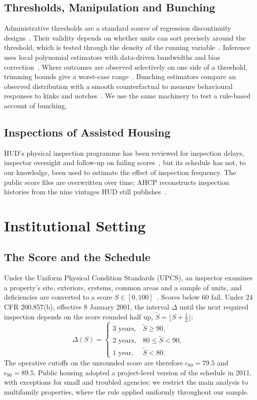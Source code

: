 \documentclass[10pt,twocolumn,letterpaper]{article}
\begin{document}
\subsection{Thresholds, Manipulation and Bunching}
Administrative thresholds are a standard source of regression discontinuity designs~\cite{lee2010}. Their validity depends on whether units can sort precisely around the threshold, which is tested through the density of the running variable~\cite{mccrary2008,cattaneo2020}. Inference uses local polynomial estimators with data-driven bandwidths and bias correction~\cite{calonico2014}. Where outcomes are observed selectively on one side of a threshold, trimming bounds give a worst-case range~\cite{lee2009}. Bunching estimators compare an observed distribution with a smooth counterfactual to measure behavioural responses to kinks and notches~\cite{kleven2016}. We use the same machinery to test a rule-based account of bunching.

\subsection{Inspections of Assisted Housing}
HUD's physical inspection programme has been reviewed for inspection delays, inspector oversight and follow-up on failing scores~\cite{gao2019}, but its schedule has not, to our knowledge, been used to estimate the effect of inspection frequency. The public score files are overwritten over time; AHCP reconstructs inspection histories from the nine vintages HUD still publishes~\cite{ahcp,ameen2026}.

\section{Institutional Setting}\label{sec:setting}
\subsection{The Score and the Schedule}
Under the Uniform Physical Condition Standards (UPCS), an inspector examines a property's site, exteriors, systems, common areas and a sample of units, and deficiencies are converted to a score $S\in[0,100]$~\cite{fr2000}. Scores below 60 fail. Under 24 CFR 200.857(b), effective 8 January 2001, the interval $\Delta$ until the next required inspection depends on the score rounded half up, $\tilde S=\lfloor S+\tfrac12\rfloor$:
\begin{equation}
\Delta(S)=\begin{cases}3\text{ years}, & \tilde S\ge 90,\\ 2\text{ years}, & 80\le\tilde S<90,\\ 1\text{ year}, & \tilde S<80.\end{cases}
\end{equation}
The operative cutoffs on the unrounded score are therefore $c_{80}=79.5$ and $c_{90}=89.5$. Public housing adopted a project-level version of the schedule in 2011, with exceptions for small and troubled agencies; we restrict the main analysis to multifamily properties, where the rule applied uniformly throughout our sample.
\end{document}
